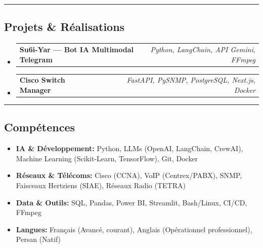 \documentclass[11pt,a4paper]{article}
\makeatletter
\newcommand{\headerrow}[2]
{\begin{tabular*}{\linewidth}{l@{\extracolsep{\fill}}r}
#1 &
#2 \\
\end{tabular*}}
\makeatother
\begin{document}
\hrule
\vspace{-1em}
\subsection*{\Large Projets \& Réalisations}

\begin{itemize}[leftmargin=1em]
	\parskip=0.1em
		
	\item
	      \headerrow
	      {\textbf{Su6i-Yar — Bot IA Multimodal Telegram}}
	      {\emph{Python, LangChain, API Gemini, FFmpeg}}
	      	      
	\item
	      \headerrow
	      {\textbf{Cisco Switch Manager}}
	      {\emph{FastAPI, PySNMP, PostgreSQL, Next.js, Docker}}
	      	      
\end{itemize}

\hrule
\vspace{-1em}
\subsection*{\Large Compétences}

\begin{itemize}[leftmargin=1em,noitemsep]
	\item \textbf{IA \& Développement:} Python, LLMs (OpenAI, LangChain, CrewAI), Machine Learning (Scikit-Learn, TensorFlow), Git, Docker
	\item \textbf{Réseaux \& Télécoms:} Cisco (CCNA), VoIP (Centrex/PABX), SNMP, Faisceaux Hertziens (SIAE), Réseaux Radio (TETRA)
	\item \textbf{Data \& Outils:} SQL, Pandas, Power BI, Streamlit, Bash/Linux, CI/CD, FFmpeg
	\item \textbf{Langues:} Français (Avancé, courant), Anglais (Opérationnel professionnel), Persan (Natif)
\end{itemize}
\end{document}

